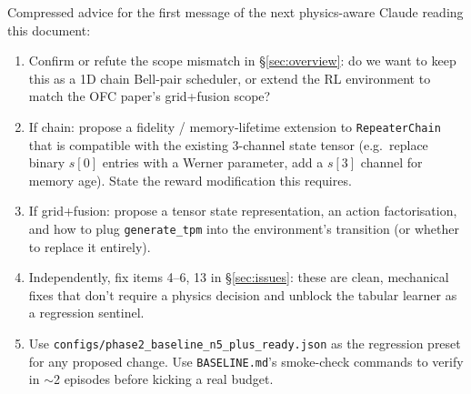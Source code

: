 \documentclass[11pt]{article}
\newcommand{\code}[1]{\texttt{#1}}
\newcommand{\file}[1]{\texttt{\small #1}}
\begin{document}
Compressed advice for the first message of the next physics-aware Claude reading this document:

\begin{enumerate}
  \item Confirm or refute the scope mismatch in \S\ref{sec:overview}: do we want to keep this as a 1D chain Bell-pair scheduler, or extend the RL environment to match the OFC paper's grid+fusion scope?
  \item If chain: propose a fidelity / memory-lifetime extension to \code{RepeaterChain} that is compatible with the existing 3-channel state tensor (e.g.\ replace binary $s[0]$ entries with a Werner parameter, add a $s[3]$ channel for memory age). State the reward modification this requires.
  \item If grid+fusion: propose a tensor state representation, an action factorisation, and how to plug \code{generate\_tpm} into the environment's transition (or whether to replace it entirely).
  \item Independently, fix items 4--6, 13 in \S\ref{sec:issues}: these are clean, mechanical fixes that don't require a physics decision and unblock the tabular learner as a regression sentinel.
  \item Use \file{configs/phase2\_baseline\_n5\_plus\_ready.json} as the regression preset for any proposed change. Use \file{BASELINE.md}'s smoke-check commands to verify in $\sim$2 episodes before kicking a real budget.
\end{enumerate}
\end{document}
